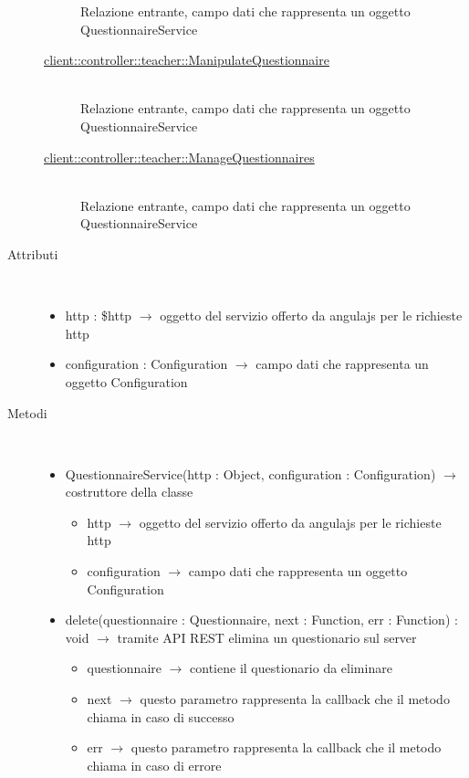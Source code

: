 \begin{description}
\begin{description}
	Relazione entrante, campo dati che rappresenta un oggetto QuestionnaireService
	\item[\hyperlink{client::controller::teacher::ManipulateQuestionnaire}{client::controller::teacher::ManipulateQuestionnaire}] \hfill \\
	Relazione entrante, campo dati che rappresenta un oggetto QuestionnaireService
	\item[\hyperlink{client::controller::teacher::ManageQuestionnaires}{client::controller::teacher::ManageQuestionnaires}] \hfill \\
	Relazione entrante, campo dati che rappresenta un oggetto QuestionnaireService
\end{description}

\item[Attributi] \hfill \\
\vspace{-7mm}
\begin{itemize}
	\item http : \$http $\rightarrow$ oggetto del servizio offerto da angulajs per le richieste http
	\item configuration : Configuration $\rightarrow$ campo dati che rappresenta un oggetto Configuration
\end{itemize}

\item[Metodi] \hfill \\
\vspace{-7mm}
\begin{itemize}
	\item QuestionnaireService(http : Object, configuration : Configuration) $\rightarrow$ costruttore della classe\begin{itemize}
		\item http $\rightarrow$ oggetto del servizio offerto da angulajs per le richieste http
		\item configuration $\rightarrow$ campo dati che rappresenta un oggetto Configuration
	\end{itemize}
	
	\item delete(questionnaire : Questionnaire, next : Function, err : Function) : void $\rightarrow$ tramite API REST elimina un questionario sul server\begin{itemize}
		\item questionnaire $\rightarrow$ contiene il questionario da eliminare
		\item next $\rightarrow$ questo parametro rappresenta la callback che il metodo chiama in caso di successo
		\item err $\rightarrow$ questo parametro rappresenta la callback che il metodo chiama in caso di errore
	\end{itemize}
	

\end{itemize}
\end{description}
